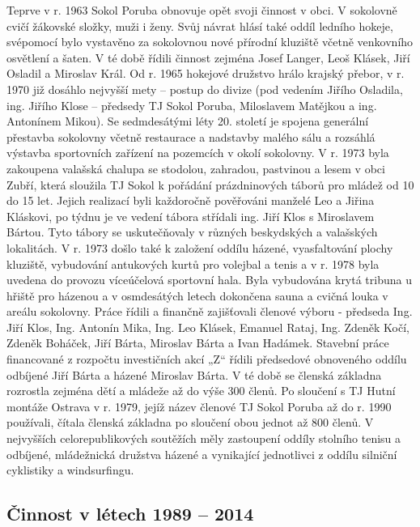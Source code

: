 \documentclass[openany]{report}
\begin{document}
Teprve v r. 1963 Sokol Poruba obnovuje opět svoji činnost v obci. V sokolovně cvičí žákovské složky, muži i ženy. Svůj návrat hlásí také oddíl ledního hokeje, svépomocí bylo vystavěno za sokolovnou nové přírodní kluziště včetně venkovního osvětlení a šaten. V té době řídili činnost zejména Josef Langer, Leoš Klásek, Jiří Osladil a Miroslav Král. Od r. 1965 hokejové družstvo hrálo krajský přebor, v r. 1970 již dosáhlo nejvyšší mety – postup do divize (pod vedením Jiřího Osladila, ing. Jiřího Klose – předsedy TJ Sokol Poruba, Miloslavem Matějkou a ing. Antonínem Mikou). Se sedmdesátými léty 20. století je spojena generální přestavba sokolovny včetně restaurace a nadstavby malého sálu a rozsáhlá výstavba sportovních zařízení na pozemcích v okolí sokolovny. V r. 1973 byla zakoupena valašská chalupa se stodolou, zahradou, pastvinou a lesem v obci Zubří, která sloužila TJ Sokol k pořádání prázdninových táborů pro mládež od 10 do 15 let. Jejich realizací byli každoročně pověřováni manželé Leo a Jiřina Kláskovi, po týdnu je ve vedení tábora střídali ing. Jiří Klos s Miroslavem Bártou. Tyto tábory se uskutečňovaly v různých beskydských a valašských lokalitách.  V r. 1973 došlo také k založení oddílu házené, vyasfaltování plochy kluziště, vybudování antukových kurtů pro volejbal a tenis a v r. 1978 byla uvedena do provozu víceúčelová sportovní hala. Byla vybudována krytá tribuna u hřiště pro házenou a v osmdesátých letech dokončena sauna a cvičná louka v areálu sokolovny. Práce řídili a finančně zajišťovali členové výboru - předseda Ing. Jiří Klos, Ing. Antonín Mika, Ing. Leo Klásek, Emanuel Rataj, Ing. Zdeněk Kočí, Zdeněk Boháček, Jiří Bárta, Miroslav Bárta a Ivan Hadámek. Stavební práce financované z rozpočtu investičních akcí „Z“ řídili předsedové obnoveného oddílu odbíjené Jiří Bárta a házené Miroslav Bárta. V té době se členská základna rozrostla zejména dětí a mládeže až do výše 300 členů. Po sloučení s TJ Hutní montáže Ostrava v r. 1979, jejíž název členové TJ Sokol Poruba až do r. 1990 používali, čítala členská základna po sloučení obou jednot až 800 členů. V nejvyšších celorepublikových soutěžích měly zastoupení oddíly stolního tenisu a odbíjené, mládežnická družstva házené a vynikající jednotlivci z oddílu silniční cyklistiky a windsurfingu.

\subsection{Činnost v létech 1989 – 2014}
\end{document}
